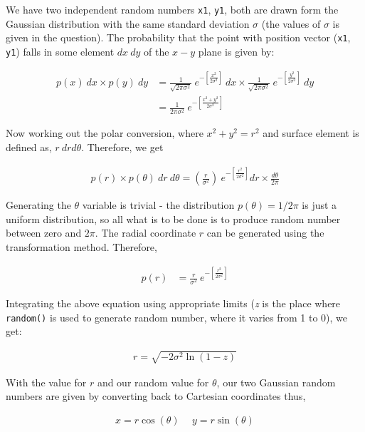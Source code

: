 \documentclass[11pt,a4paper]{article}
\begin{document}
We have two independent random numbers \texttt{x1}, \texttt{y1}, both are drawn form the Gaussian distribution with the same standard deviation $\sigma$ (the values of $\sigma$ is given in the question). The probability that the point with position vector (\texttt{x1}, \texttt{y1}) falls in some element $dx\ dy$ of the $x-y$ plane is given by:

\begin{align*}
p(x)\ dx \times p(y)\ dy &=  \frac{1}{\sqrt{2\pi\sigma^2}}\ e^{-\left[\frac{x^2}{2\sigma^2}\right]}\ dx \times \frac{1}{\sqrt{2\pi\sigma^2}}\ e^{-\left[\frac{y^2}{2\sigma^2}\right]}\ dy \\
&= \frac{1}{2\pi\sigma^2}\ e^{-\left[\frac{x^2+y^2}{2\sigma^2}\right]}
\end{align*}

Now working out the polar conversion, where $x^2 + y^2 = r^2$ and surface element is defined as, $r\ dr d\theta$. Therefore, we get

\begin{align*}
p(r)\times p(\theta)\ dr\ d\theta = \left(\frac{r}{\sigma^2}\right) \ e^{-\left[\frac{r^2}{2\sigma^2}\right]}dr \times \frac{d\theta}{2\pi} 
\end{align*} 

Generating the $\theta$ variable is trivial - the distribution $p(\theta) = 1/2\pi$ is just a uniform distribution, so all what is to be done is to produce random number between zero and $2\pi$. The radial coordinate $r$ can be generated using the transformation method. Therefore,

\begin{align*}
p(r) &= \frac{r}{\sigma^2}\ e^{-\left[\frac{r^2}{2\sigma^2}\right]}
\end{align*}

Integrating the above equation using appropriate limits (\textit{z} is the place where \texttt{random()} is used to generate random number, where it varies from 1 to 0), we get:

\begin{align*}
r = \sqrt{-2\sigma^2\ln(1-z)}
\end{align*}

With the value for $r$ and our random value for $\theta$, our two Gaussian random numbers are given by converting back to Cartesian coordinates thus,

\begin{align*}
x = r\cos(\theta)\ &\ y = r\sin(\theta)
\end{align*}
\end{document}
